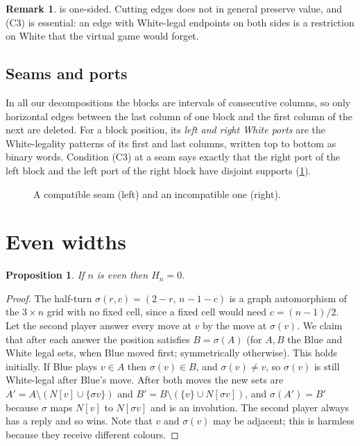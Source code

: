 \documentclass[11pt]{amsart}
\newtheorem{proposition}[theorem]{Proposition}
\theoremstyle{definition}
\newtheorem{remark}[theorem]{Remark}
\newcommand{\Nb}{N}
\begin{document}
\begin{remark}
 is one-sided. Cutting edges does not in general preserve
value, and (C3) is essential: an edge with White-legal endpoints on both sides
is a restriction on White that the virtual game would forget.
\end{remark}

\subsection{Seams and ports}
In all our decompositions the blocks are intervals of consecutive columns, so
only horizontal edges between the last column of one block and the first
column of the next are deleted. For a block position, its \emph{left and right
White ports} are the White-legality patterns of its first and last columns,
written top to bottom as binary words. Condition (C3) at a seam says exactly
that the right port of the left block and the left port of the right block
have disjoint supports (\cref{fig:seams}).

\begin{figure}[ht]
\centering
{}
\caption{A compatible seam (left) and an incompatible one (right).}
\label{fig:seams}
\end{figure}

\section{Even widths}\label{sec:even}

\begin{proposition}\label{prop:even}
If $n$ is even then $H_n=0$.
\end{proposition}

\begin{proof}
The half-turn $\sigma(r,c)=(2-r,\,n-1-c)$ is a graph automorphism of the
$3\times n$ grid with no fixed cell, since a fixed cell would need
$c=(n-1)/2$. Let the second player answer every move at $v$ by the move at
$\sigma(v)$. We claim that after each answer the position satisfies
$B=\sigma(A)$ (for $A,B$ the Blue and White legal sets, when Blue moved first;
symmetrically otherwise). This holds initially. If Blue plays $v\in A$ then
$\sigma(v)\in B$, and $\sigma(v)\ne v$, so $\sigma(v)$ is still White-legal
after Blue's move. After both moves the new sets are
$A'=A\setminus(\Nb[v]\cup\{\sigma v\})$ and
$B'=B\setminus(\{v\}\cup\Nb[\sigma v])$, and $\sigma(A')=B'$ because $\sigma$
maps $\Nb[v]$ to $\Nb[\sigma v]$ and is an involution. The second player
always has a reply and so wins. Note that $v$ and $\sigma(v)$ may be adjacent;
this is harmless because they receive different colours.
\end{proof}
\end{document}
